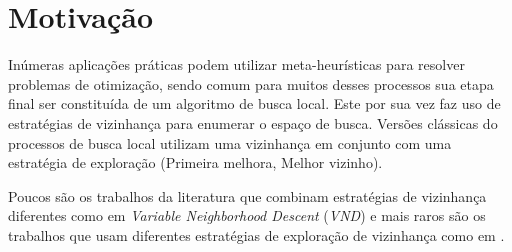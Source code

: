 

\section{Motivação}\label{sec:motivacao}

Inúmeras aplicações práticas podem utilizar meta-heurísticas para resolver problemas de otimização, sendo comum para muitos desses processos sua etapa final ser constituída de um algoritmo de busca local.
Este por sua vez faz uso de estratégias de vizinhança para enumerar o espaço de busca.
Versões clássicas do processos de busca local utilizam uma vizinhança em conjunto com uma estratégia de exploração (Primeira melhora, Melhor vizinho).

Poucos são os trabalhos da literatura que combinam estratégias de vizinhança diferentes como em \emph{Variable Neighborhood Descent} (\emph{VND}) e mais raros são os trabalhos que usam diferentes estratégias de exploração de vizinhança como em \cite{vns2015}.

